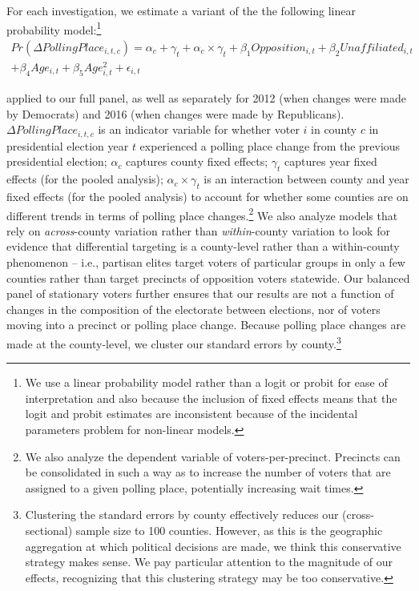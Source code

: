 \documentclass[12pt]{article}
\begin{document}
For each investigation, we estimate a variant of the the following linear probability model:\footnote{We use a linear probability model rather than a logit or probit for ease of interpretation and also because the inclusion of fixed effects means that the logit and probit estimates are inconsistent because of the incidental parameters problem for non-linear models.}
\begin{align}
	Pr(\Delta Polling Place_{i,t,c}) = \alpha_{c} + \gamma_{t} + \alpha_{c}\times\gamma_{t} + \beta_1 Opposition_{i,t} + \beta_2 Unaffiliated_{i,t} \nonumber \\
  + \beta_{4}Age_{i,t} + \beta_{5}Age_{i,t}^{2} + \epsilon_{i,t} \label{equation_panel_party}
\end{align}\normalsize

applied to our full panel, as well as separately for 2012 (when changes were made by Democrats) and 2016 (when changes were made by Republicans). $\Delta  Polling Place_{i,t,c}$ is an indicator variable for whether voter $i$ in county $c$ in presidential election year $t$ experienced a polling place change from the previous presidential election; $\alpha_{c}$ captures county fixed effects; $\gamma_{t}$ captures year fixed effects (for the pooled analysis); $\alpha_{c}\times\gamma_{t}$ is an interaction between county and year fixed effects (for the pooled analysis) to account for whether some counties are on different trends in terms of polling place changes.\footnote{We also analyze the dependent variable of voters-per-precinct.  Precincts can be consolidated in such a way as to increase the number of voters that are assigned to a given polling place, potentially increasing wait times.} We also analyze models that rely on \emph{across}-county variation rather than \emph{within}-county variation to look for evidence that differential targeting is a county-level rather than a within-county phenomenon -- i.e., partisan elites target voters of particular groups in only a few counties rather than target precincts of opposition voters statewide.  Our balanced panel of stationary voters further ensures that our results are not a function of changes in the composition of the electorate between elections, nor of voters moving into a precinct or polling place change.  Because polling place changes are made at the county-level, we cluster our standard errors by county.\footnote{Clustering the standard errors by county effectively reduces our (cross-sectional) sample size to 100 counties.  However, as this is the geographic aggregation at which political decisions are made, we think this conservative strategy makes sense.  We pay particular attention to the magnitude of our effects, recognizing that this clustering strategy may be too conservative.}
\end{document}

